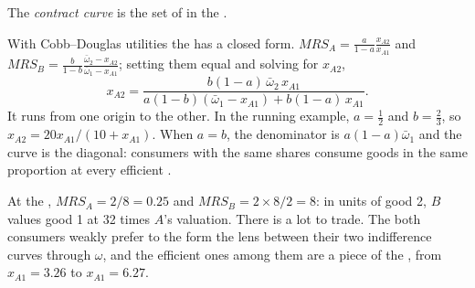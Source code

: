 \begin{definition}\label{def:b2:exchange-economies:contract-curve}
The \emph{contract curve} is the set of  in the
.
\end{definition}

With Cobb--Douglas utilities the  has a closed form. $\mathit{MRS}_A = \frac{a}{1 - a}
\frac{x_{A2}}{x_{A1}}$ and $\mathit{MRS}_B = \frac{b}{1 - b}\frac{\bar\omega_2 - x_{A2}}{\bar\omega_1 -
x_{A1}}$; setting them equal and solving for $x_{A2}$,
\begin{equation}\label{eq:b2:exchange-economies:contract}
x_{A2} = \frac{b(1 - a)\,\bar\omega_2\,x_{A1}}{a(1 - b)(\bar\omega_1 - x_{A1}) + b(1 - a)\,x_{A1}} .
\end{equation}
It runs from one origin to the other. In the running example, $a = \tfrac12$ and $b = \tfrac23$, so $x_{A2}
= 20x_{A1}/(10 + x_{A1})$. When $a = b$, the denominator is $a(1 - a)\bar\omega_1$ and the curve is the
diagonal: consumers with the same shares consume goods in the same proportion at every efficient
.

At the , $\mathit{MRS}_A = 2/8 = 0.25$ and $\mathit{MRS}_B = 2 \times 8/2 = 8$: in units of good 2,
$B$ values good 1 at 32 times $A$'s valuation. There is a lot to trade. The  both
consumers weakly prefer to the  form the lens between their two indifference curves through
$\omega$, and the efficient ones among them are a piece of the , from $x_{A1} = 3.26$ to
$x_{A1} = 6.27$.


